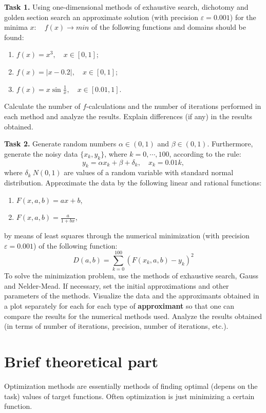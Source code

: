 \documentclass[12pt, a4paper]{article}
\begin{document}
\textbf{Task 1.} Using one-dimensional methods of exhaustive search, dichotomy and golden section search an approximate solution (with precision $\varepsilon = 0.001$) for the minima $x: \quad f(x) \to min$ of the following functions and domains should be found:
\begin{enumerate}
	\item $f(x) = x^3, \quad x\in [0, 1]$;
	\item $f(x) = |x-0.2|, \quad x\in [0, 1]$;
	\item $f(x) = x\sin \frac{1}{x}, \quad x\in [0.01, 1]$.
\end{enumerate}
Calculate the number of $f$-calculations and the number of iterations performed in each method and analyze the results. Explain differences (if any) in the results obtained.

\textbf{Task 2.} Generate random numbers $\alpha \in (0, 1)$ and $\beta \in (0, 1)$. Furthermore, generate the noisy data $\{ x_k, y_k \}$, where $k = 0, \cdots, 100$, according to the rule:
\[ y_k = \alpha x_k + \beta + \delta_k, \quad x_k = 0.01 k, \]
where $\delta_k ~ N(0, 1)$ are values of a random variable with standard normal distribution. Approximate the data by the following linear and rational functions:
\begin{enumerate}
	\item $F(x, a, b) = ax + b$,
	\item $F(x, a, b) = \frac{a}{1+bx}$,
\end{enumerate}
by means of least squares through the numerical minimization (with precision $\varepsilon = 0.001$) of the following function:
\[ D(a, b) = \sum_{k=0}^{100} \left( F(x_k, a, b) - y_k \right)^2 \]
To solve the minimization problem, use the methods of exhaustive search, Gauss and Nelder-Mead. If necessary, set the initial approximations and other parameters of the methods. Visualize the data and the approximants obtained in a plot separately for each for each type of \textbf{approximant} so that one can compare the results for the numerical methods used. Analyze the results obtained (in terms of number of iterations, precision, number of iterations, etc.).

\newpage

\section*{Brief theoretical part}

Optimization methods are essentially methods of finding optimal (depens on the task) values of target functions. Often optimization is just minimizing a certain function.
\end{document}
